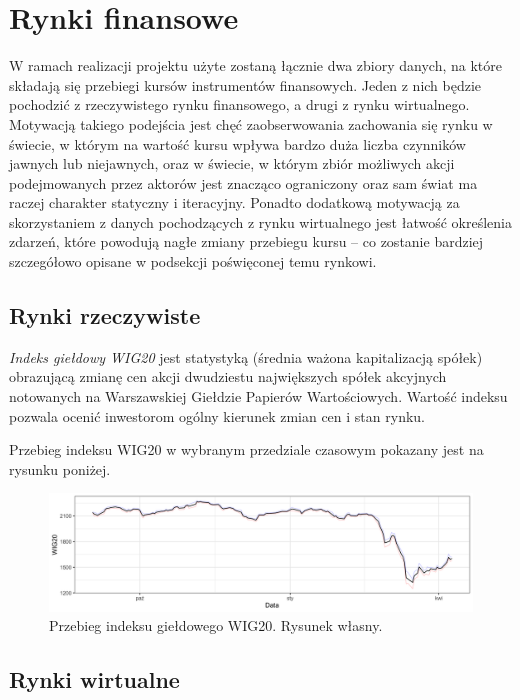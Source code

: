 \documentclass{article}
\begin{document}
  \section{Rynki finansowe \label{r2}}

  W ramach realizacji projektu użyte zostaną łącznie dwa zbiory danych, na
  które składają się przebiegi kursów instrumentów finansowych. Jeden z
  nich będzie pochodzić z rzeczywistego rynku finansowego, a drugi z rynku
  wirtualnego. Motywacją takiego podejścia jest chęć zaobserwowania
  zachowania się rynku w świecie, w którym na wartość kursu wpływa bardzo
  duża liczba czynników jawnych lub niejawnych, oraz w świecie, w którym
  zbiór możliwych akcji podejmowanych przez aktorów jest znacząco
  ograniczony oraz sam świat ma raczej charakter statyczny i iteracyjny.
  Ponadto dodatkową motywacją za skorzystaniem z danych pochodzących z
  rynku wirtualnego jest łatwość określenia zdarzeń, które powodują nagłe
  zmiany przebiegu kursu -- co zostanie bardziej szczegółowo opisane w
  podsekcji poświęconej temu rynkowi.

\subsection{Rynki rzeczywiste}

  \emph{Indeks giełdowy WIG20} jest statystyką (średnia ważona
  kapitalizacją spółek) obrazującą zmianę cen akcji dwudziestu
  największych spółek akcyjnych notowanych na Warszawskiej Giełdzie
  Papierów Wartościowych. Wartość indeksu pozwala ocenić inwestorom ogólny
  kierunek zmian cen i stan rynku.

  Przebieg indeksu WIG20 w wybranym przedziale czasowym pokazany jest na
  rysunku poniżej.

\begin{figure}
    \centering
    \includegraphics[width=\textwidth]{./images/wig20-random.png}
    \caption{Przebieg indeksu giełdowego WIG20. Rysunek własny.}
\end{figure}
\subsection{Rynki wirtualne}
\end{document}
